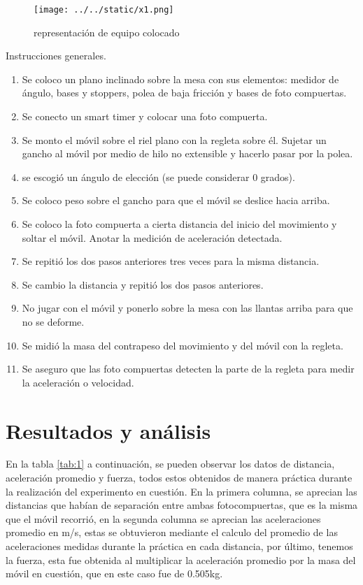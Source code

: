\documentclass{article}
\begin{document}
\begin{multicols}{2}
\begin{figure}[H]
	\centering	
	\texttt{[image: ../../static/x1.png]}
	\caption{representación de equipo colocado}
	\label{fig:1}
\end{figure}

Instrucciones generales.

\begin{enumerate}
\item Se coloco un plano inclinado sobre la mesa con sus elementos: medidor de ángulo, bases y stoppers, polea de baja fricción y bases de foto compuertas.
\item Se conecto un smart timer y colocar una foto compuerta.
\item Se monto el móvil sobre el riel plano con la regleta sobre él. Sujetar un gancho al móvil por medio de hilo no extensible y hacerlo pasar por la polea.
\item se escogió un ángulo de elección (se puede considerar 0 grados).
\item Se coloco peso sobre el gancho para que el móvil se deslice hacia arriba.
\item Se coloco la foto compuerta a cierta distancia del inicio del movimiento y soltar el móvil. Anotar la medición de aceleración detectada.
\item Se repitió los dos pasos anteriores tres veces para la misma distancia.
\item Se cambio la distancia y repitió los dos pasos anteriores.
\item No jugar con el móvil y ponerlo sobre la mesa con las llantas arriba para que no se deforme.
\item Se midió la masa del contrapeso del movimiento y del móvil con la regleta.
\item Se aseguro que las foto compuertas detecten la parte de la regleta para medir la aceleración o velocidad.
\end{enumerate}


\end{multicols}
\section{Resultados y análisis}\label{Resultados}			%
En la tabla \ref{tab:1} a continuación, se pueden observar los datos de distancia, aceleración promedio y fuerza, todos estos obtenidos de manera práctica durante la realización del experimento en cuestión. En la primera columna, se aprecian las distancias que habían de separación entre ambas fotocompuertas, que es la misma que el móvil recorrió, en la segunda columna se aprecian las aceleraciones promedio en m/s, estas se obtuvieron mediante el calculo del promedio de las aceleraciones medidas durante la práctica en cada distancia, por último, tenemos la fuerza, esta fue obtenida al multiplicar la aceleración promedio por la masa del móvil en cuestión, que en este caso fue de 0.505kg. 
\end{document}

